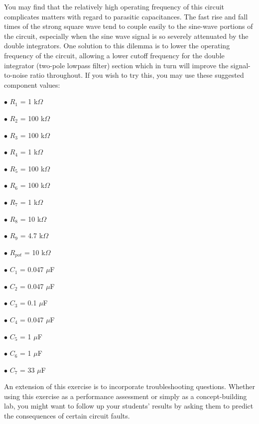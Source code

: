 \vskip 10pt

You may find that the relatively high operating frequency of this circuit complicates matters with regard to parasitic capacitances.  The fast rise and fall times of the strong square wave tend to couple easily to the sine-wave portions of the circuit, especially when the sine wave signal is so severely attenuated by the double integrators.  One solution to this dilemma is to lower the operating frequency of the circuit, allowing a lower cutoff frequency for the double integrator (two-pole lowpass filter) section which in turn will improve the signal-to-noise ratio throughout.  If you wish to try this, you may use these suggested component values:

\medskip
\goodbreak
\item{$\bullet$} $R_1$ = 1 k$\Omega$
\item{$\bullet$} $R_2$ = 100 k$\Omega$
\item{$\bullet$} $R_3$ = 100 k$\Omega$ 
\item{$\bullet$} $R_4$ = 1 k$\Omega$ 
\item{$\bullet$} $R_5$ = 100 k$\Omega$ 
\item{$\bullet$} $R_6$ = 100 k$\Omega$ 
\item{$\bullet$} $R_7$ = 1 k$\Omega$ 
\item{$\bullet$} $R_8$ = 10 k$\Omega$ 
\item{$\bullet$} $R_9$ = 4.7 k$\Omega$
\item{$\bullet$} $R_{pot}$ = 10 k$\Omega$
\item{$\bullet$} $C_1$ = 0.047 $\mu$F
\item{$\bullet$} $C_2$ = 0.047 $\mu$F
\item{$\bullet$} $C_3$ = 0.1 $\mu$F
\item{$\bullet$} $C_4$ = 0.047 $\mu$F
\item{$\bullet$} $C_5$ = 1 $\mu$F
\item{$\bullet$} $C_6$ = 1 $\mu$F
\item{$\bullet$} $C_7$ = 33 $\mu$F
\medskip

An extension of this exercise is to incorporate troubleshooting questions.  Whether using this exercise as a performance assessment or simply as a concept-building lab, you might want to follow up your students' results by asking them to predict the consequences of certain circuit faults.




